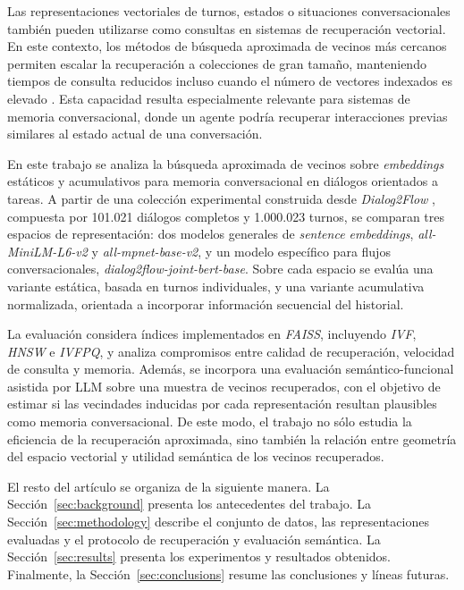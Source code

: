 \documentclass[runningheads]{llncs}
\begin{document}
Las representaciones vectoriales de turnos, estados o situaciones conversacionales también pueden utilizarse como consultas en sistemas de recuperación vectorial. En este contexto, los métodos de búsqueda aproximada de vecinos más cercanos permiten escalar la recuperación a colecciones de gran tamaño, manteniendo tiempos de consulta reducidos incluso cuando el número de vectores indexados es elevado \cite{johnson2021billion,malkov2020hnsw}. Esta capacidad resulta especialmente relevante para sistemas de memoria conversacional, donde un agente podría recuperar interacciones previas similares al estado actual de una conversación.

En este trabajo se analiza la búsqueda aproximada de vecinos sobre \textit{embeddings} estáticos y acumulativos para memoria conversacional en diálogos orientados a tareas. A partir de una colección experimental construida desde \textit{Dialog2Flow} \cite{burdisso2024dialog2flow}, compuesta por 101.021 diálogos completos y 1.000.023 turnos, se comparan tres espacios de representación: dos modelos generales de \textit{sentence embeddings}, \textit{all-MiniLM-L6-v2} y \textit{all-mpnet-base-v2}, y un modelo específico para flujos conversacionales, \textit{dialog2flow-joint-bert-base}. Sobre cada espacio se evalúa una variante estática, basada en turnos individuales, y una variante acumulativa normalizada, orientada a incorporar información secuencial del historial.

La evaluación considera índices implementados en \textit{FAISS}, incluyendo \textit{IVF}, \textit{HNSW} e \textit{IVFPQ}, y analiza compromisos entre calidad de recuperación, velocidad de consulta y memoria. Además, se incorpora una evaluación semántico-funcional asistida por LLM sobre una muestra de vecinos recuperados, con el objetivo de estimar si las vecindades inducidas por cada representación resultan plausibles como memoria conversacional. De este modo, el trabajo no sólo estudia la eficiencia de la recuperación aproximada, sino también la relación entre geometría del espacio vectorial y utilidad semántica de los vecinos recuperados.

El resto del artículo se organiza de la siguiente manera. La Sección~\ref{sec:background} presenta los antecedentes del trabajo. La Sección~\ref{sec:methodology} describe el conjunto de datos, las representaciones evaluadas y el protocolo de recuperación y evaluación semántica. La Sección~\ref{sec:results} presenta los experimentos y resultados obtenidos. Finalmente, la Sección~\ref{sec:conclusions} resume las conclusiones y líneas futuras.
\end{document}

